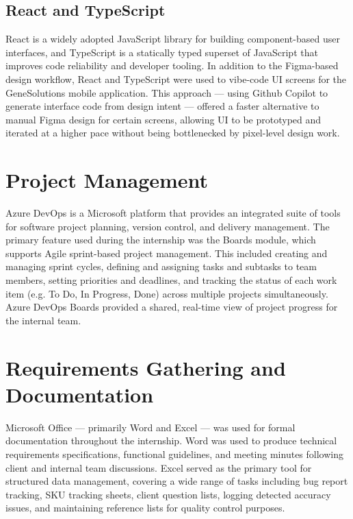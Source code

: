 \subsection{React and TypeScript}

React is a widely adopted JavaScript library for building component-based user interfaces, and TypeScript is a statically typed superset of JavaScript that improves code reliability and developer tooling. In addition to the Figma-based design workflow, React and TypeScript were used to vibe-code UI screens for the GeneSolutions mobile application. This approach — using Github Copilot to generate interface code from design intent — offered a faster alternative to manual Figma design for certain screens, allowing UI to be prototyped and iterated at a higher pace without being bottlenecked by pixel-level design work.

\section{Project Management}

Azure DevOps is a Microsoft platform that provides an integrated suite of tools for software project planning, version control, and delivery management. The primary feature used during the internship was the Boards module, which supports Agile sprint-based project management. This included creating and managing sprint cycles, defining and assigning tasks and subtasks to team members, setting priorities and deadlines, and tracking the status of each work item (e.g. To Do, In Progress, Done) across multiple projects simultaneously. Azure DevOps Boards provided a shared, real-time view of project progress for the internal team.

\section{Requirements Gathering and Documentation}

Microsoft Office — primarily Word and Excel — was used for formal documentation throughout the internship. Word was used to produce technical requirements specifications, functional guidelines, and meeting minutes following client and internal team discussions. Excel served as the primary tool for structured data management, covering a wide range of tasks including bug report tracking, SKU tracking sheets, client question lists, logging detected accuracy issues, and maintaining reference lists for quality control purposes.

